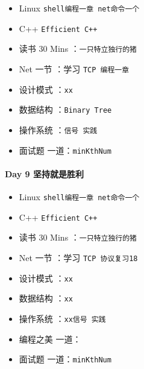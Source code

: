 \documentclass[UTF8,a4paper,8pt]{ctexart}
\begin{document}
	 	 \begin{itemize}[itemindent = 1em]
	 	 	\renewcommand\labelitemi{\makebox[0pt][l]{$\square$}\hspace{1em}} 
	 	 	\renewcommand\labelitemi{\makebox[0pt][l]{$\square$}\raisebox{.15ex}{\hspace{0.1em}$\checkmark$}}	 	
	 	 	\item   Linux \verb|shell编程一章 net命令一个|
	 	 	\item   C++   \verb|Efficient C++|
	 	 	
	 	 	\item   读书  30 Mins	：\verb|一只特立独行的猪|
	 	 	\item   Net 一节 ：学习 \verb|TCP 编程一章|	
	 	 	
	 	 	\renewcommand\labelitemi{\makebox[0pt][l]{$\square$}\hspace{1em}}
	 	 	\item   设计模式 ：\verb|xx| 
	 	 	\item   数据结构 ：\verb|Binary Tree| 
	 	 	\item   操作系统 ：\verb|信号 实践|
	 	 	\item   面试题 一道：\verb|minKthNum|
	 	 \end{itemize}
 	 \paragraph{Day 9   坚持就是胜利    \quad     }
	 	 
	 	 \begin{itemize}[itemindent = 1em]
	 	 	\renewcommand\labelitemi{\makebox[0pt][l]{$\square$}\hspace{1em}} 
	 	 	\renewcommand\labelitemi{\makebox[0pt][l]{$\square$}\raisebox{.15ex}{\hspace{0.1em}$\checkmark$}}	 	
	 	 	\item   Linux \verb|shell编程一章 net命令一个|
	 	 	\item   C++   \verb|Efficient C++|
	 	 	
	 	 	\item   读书  30 Mins	：\verb|一只特立独行的猪|
	 	 	\item   Net 一节 ：学习 \verb|TCP 协议复习18|	
	 	 	
	 	 	\renewcommand\labelitemi{\makebox[0pt][l]{$\square$}\hspace{1em}}
	 	 	\item   设计模式 ：\verb|xx| 
	 	 	\item   数据结构 ：\verb|xx| 
	 	 	\item   操作系统 ：\verb|xx信号 实践|
	 	 	\item   编程之美 一道： 
	 	 	\item   面试题 一道：\verb|minKthNum|
	 	 \end{itemize}
\end{document}
